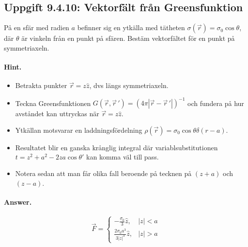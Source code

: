 \documentclass[%
oneside,                 %
final,                   %
10pt]{article}
\newenvironment{doconceexercise}{}{}
\newcounter{doconceexercisecounter}
\begin{document}
\begin{doconceexercise}

\subsection{Uppgift 9.4.10: Vektorfält från Greensfunktion}

På en sfär med radien $a$ befinner sig en ytkälla med tätheten $\sigma(\vec r)=\sigma_0\cos\theta$, där $\theta$ är vinkeln från en punkt på sfären. Bestäm vektorfältet för en punkt på symmetriaxeln.


\paragraph{Hint.}
\begin{itemize}
\item Betrakta punkter $\vec{r} = z\hat{z}$, dvs längs symmetriaxeln.

\item Teckna Greensfunktionen $G(\vec{r},\vec{r}\,') = (4\pi|\vec{r}-\vec{r}\,'|)^{-1}$ och fundera på hur avståndet kan uttryckas när $\vec{r}=z\hat{z}$.

\item Ytkällan motsvarar en laddningsfördelning $\rho(\vec{r}) = \sigma_0 \cos\theta \delta(r-a)$.

\item Resultatet blir en ganska krånglig integral där variablsubstitutionen $t = z^2 +a^2−2za\cos\theta'$ kan komma väl till pass.

\item Notera sedan att man får olika fall beroende på tecknen på $(z+a)$ och $(z-a)$.
\end{itemize}

\noindent


\paragraph{Answer.}
\begin{equation}
\vec F = \left\{
\begin{array}{ll}
-\frac{\sigma_0}3\hat z, & |z| < a \\
\frac{2\sigma_0a^3}{3|z|^3}\hat z, & |z|>a
\end{array}
\right.
\end{equation}


\end{doconceexercise}
\end{document}
